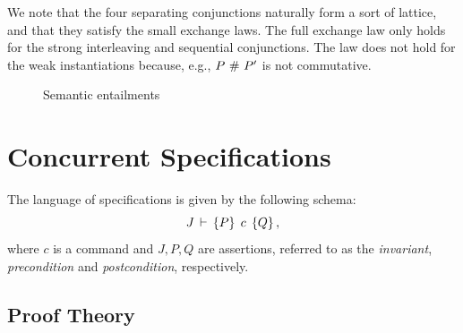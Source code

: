 \documentclass[11pt]{report}
\begin{document}
We note that the four separating conjunctions naturally form a sort of lattice, and that they satisfy the small exchange laws. The full exchange law only holds for the strong interleaving and sequential conjunctions. The law does not hold for the weak instantiations because, e.g., $P \operatorname{\,\#\,} P'$ is not commutative. 

\begin{figure}[ht]
	\centering
	\caption{\label{fig:entailments}Semantic entailments}
\end{figure}


\section{Concurrent Specifications}
\label{sec:specifications}

The language of specifications is given by the following schema: \[ J\,\vdash\,\left\lbrace P \right\rbrace\;c\;\left\lbrace Q \right\rbrace, \] where $c$ is a command and $J,P,Q$ are assertions, referred to as the \emph{invariant}, \emph{precondition} and \emph{postcondition}, respectively. 

\subsection{Proof Theory}
\label{sec:proof-theory}
\end{document}
